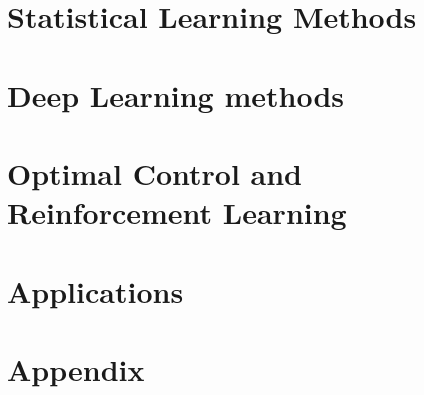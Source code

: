 \documentclass[oneside,hidelinks,12pt,letterpaper]{scrbook} %
\theoremstyle{remark}
\theoremstyle{coloredRemark}
\theoremstyle{coloredNote}
\begin{document}
\startcontents[chapters]
\part{Statistical Learning Methods}




\startcontents[chapters]
\part{Deep Learning methods}



\startcontents[chapters]	
\part{Optimal Control and Reinforcement Learning}



\startcontents[chapters]	
\part{Applications}





\startcontents[chapters]
\part{Appendix}
\appendix





\printindex
\end{document}
